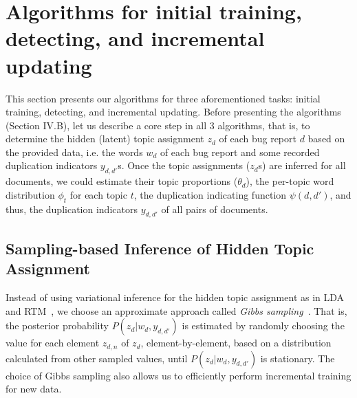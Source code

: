 \section{Algorithms for initial training, detecting, and incremental updating}
\label{algorithm}

This section presents our algorithms for three aforementioned tasks:
initial training, detecting, and incremental updating. Before
presenting the algorithms (Section IV.B), let us describe a core step
in all 3 algorithms, that is, to determine the hidden (latent) topic
assignment $z_d$ of each bug report $d$ based on the provided data,
i.e. the words $w_d$ of each bug report and some recorded duplication
indicators $y_{d,d'}$s. Once the topic assignments ($z_d$s) are
inferred for all documents, we could estimate their topic proportions
($\theta_d$), the per-topic word distribution $\phi_t$ for each topic
$t$, the duplication indicating function $\psi(d,d')$, and thus, the
duplication indicators $y_{d,d'}$ of all pairs of documents.

\subsection{Sampling-based Inference of Hidden Topic Assignment}


Instead of using variational inference for the hidden topic assignment
as in LDA~\cite{lda} and RTM~\cite{RTM}, we choose an approximate
approach called {\em Gibbs sampling}~\cite{gibb}. That is, the
posterior probability $P(z_d|w_d, y_{d,d'})$ is estimated by randomly
choosing the value for each element $z_{d,n}$ of $z_d$,
element-by-element, based on a distribution calculated from other
sampled values, until $P(z_d|w_d, y_{d,d'})$ is stationary. The choice
of Gibbs sampling also allows us to efficiently perform incremental
training for new data.




